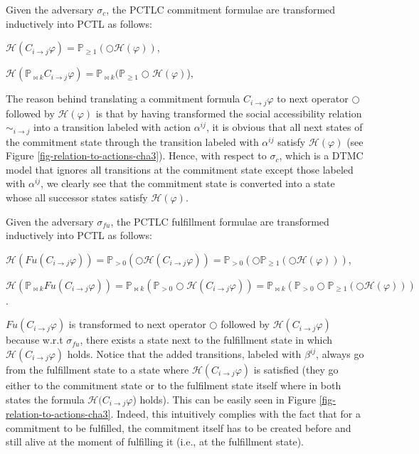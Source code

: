 Given the adversary $\sigma_c$, the PCTLC commitment formulae are
transformed inductively into PCTL as follows:

$\mathscr{H}(C_{i\rightarrow j}\varphi)= \mathbb{P}_{\geq 1}(\bigcirc \mathscr{H}(\varphi))$,

$\mathscr{H}(\mathbb{P}_{\bowtie k} C_{i\rightarrow j}\varphi)= \mathbb{P}_{\bowtie k}(\mathbb{P}_{\geq 1}\bigcirc\mathscr{H}(\varphi)$),


The reason behind translating a commitment formula
$C_{i\rightarrow j}\varphi$ to next operator $\bigcirc$ followed
by $\mathscr{H}(\varphi)$ is that by having transformed the social
accessibility relation $\sim_{i \rightarrow j}$ into a transition
labeled with action $\alpha^{ij}$, it is obvious that all next
states of the commitment state through the transition labeled with
$\alpha^{ij}$ satisfy $\mathscr{H}(\varphi)$ (see Figure
\ref{fig-relation-to-actions-cha3}). Hence, with respect to $\sigma_c$,
which is a DTMC model that ignores all transitions at the
commitment state except those labeled with $\alpha^{ij}$, we
clearly see that the commitment state is converted into a state
whose all successor states satisfy $\mathscr{H}(\varphi)$.

Given the adversary $\sigma_{fu}$, the PCTLC fulfillment formulae
are transformed inductively into PCTL as follows:

$\mathscr{H}(Fu(C_{i\rightarrow j}\varphi))= \mathbb{P}_{>0}(\bigcirc \mathscr{H}(C_{i\rightarrow j}\varphi))= \mathbb{P}_{>0}(\bigcirc\mathbb{P}_{\geq 1}(\bigcirc \mathscr{H}(\varphi)))$,

$\mathscr{H}(\mathbb{P}_{\bowtie k} Fu(C_{i\rightarrow j}\varphi))= \mathbb{P}_{\bowtie k} (\mathbb{P}_{>0}\bigcirc\mathscr{H}(C_{i\rightarrow j}\varphi))= \mathbb{P}_{\bowtie k}(\mathbb{P}_{>0}\bigcirc\mathbb{P}_{\geq 1}(\bigcirc \mathscr{H}(\varphi)))$.

$Fu(C_{i\rightarrow j}\varphi)$ is transformed to next operator
$\bigcirc$ followed by $\mathscr{H}(C_{i\rightarrow j}\varphi)$
because w.r.t $\sigma_{fu}$, there exists a state next to the
fulfillment state in which $\mathscr{H}(C_{i\rightarrow
j}\varphi)$ holds. Notice that the added transitions, labeled with
$\beta^{ij}$, always go from the fulfillment state to a state
where  $\mathscr{H}(C_{i\rightarrow j}\varphi)$ is satisfied (they
go either to the commitment state or to the fulfilment state
itself where in both states the formula
$\mathscr{H}(C_{i\rightarrow j}\varphi$) holds). This can be
easily seen in Figure \ref{fig-relation-to-actions-cha3}. Indeed, this
intuitively complies with the fact that for a commitment to be
fulfilled, the commitment itself has to be created before and
still alive at the moment of fulfilling it (i.e., at the
fulfillment state).
%
%
%

